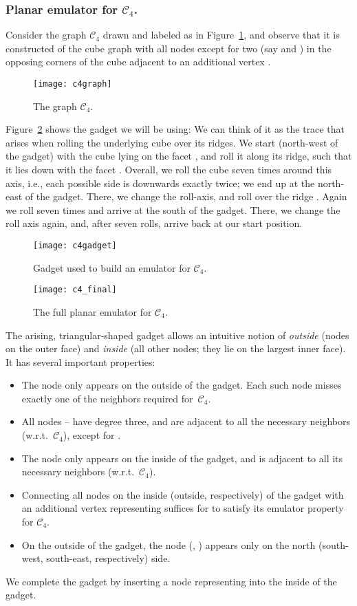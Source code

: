 \documentclass[envcountsect,envcountsame]{llncs}
\renewenvironment{accumulate}{}{}
\newcommand{\CC}{\ensuremath{\mathcal{C}_4}\xspace}
\begin{document}
\begin{accumulate}
\subsubsection{Planar emulator for \CC.}
Consider the graph \CC drawn and labeled as in Figure~\ref{fig:c4},
and observe that it is constructed of the cube graph with
all nodes except for two (say  and ) in the opposing corners of the cube
adjacent to an additional vertex .

\begin{figure}[htdp]
\centering\bigskip
\texttt{[image: c4graph]}
\caption{The graph \CC.\label{fig:c4}}
\end{figure}

Figure~\ref{fig:c4gadget} shows the gadget we will be using: We can think of it as the
trace that arises when rolling the underlying cube over its ridges.
We start (north-west of the gadget) with the cube lying on the facet 
, and roll it along its  ridge, such that it lies down
with the facet . 
Overall, we roll the cube seven times around this axis,
i.e., each possible side is downwards exactly twice; we end up at the 
north-east of the gadget. There, we change the roll-axis,
and roll over the ridge . Again we roll seven times and arrive at the 
south of the gadget. There, we change the roll axis again, and, after seven rolls, 
arrive back at our start position. 

\begin{figure}[tbp]
\centering
\texttt{[image: c4gadget]}
\caption{Gadget used to build an emulator for \CC.\label{fig:c4gadget}}
\end{figure}

\begin{figure}[htb]
\centering
\texttt{[image: c4\_final]}
\caption{The full planar emulator for \CC.\label{fig:c4emul}}
\end{figure}

The arising, triangular-shaped gadget
allows an intuitive notion of \emph{outside} (nodes on the outer face) and 
\emph{inside} (all other nodes; they lie on the largest inner face). It
has several important properties: 
\begin{itemize}
\item The node  only appears on the outside of the gadget. Each such node 
misses exactly one of the neighbors required for~\CC.
\item All nodes --
have degree three, and are adjacent to all the necessary neighbors (w.r.t.\ \CC),
except for .
\item The node  only appears on the inside of the gadget, and is adjacent to
all its necessary neighbors (w.r.t.\ \CC). 
\item Connecting all nodes on the inside (outside, respectively) of the gadget 
with an additional vertex  representing  suffices for  to satisfy
its emulator property for \CC.
\item On the outside of the gadget, the node  (, ) appears
only on the north (south-west, south-east, respectively) side.
\end{itemize}
We complete the gadget by inserting a node representing  into the inside of 
the gadget.


\end{accumulate}
\end{document}
